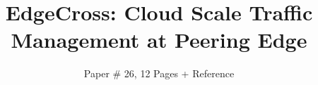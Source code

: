 \documentclass[letterpaper,twocolumn,10pt]{article}
\newcommand{\sys}{EdgeCross} %
\begin{document}


\date{}

\title{\Large \bf \sys: Cloud Scale Traffic Management at Peering Edge}

\author{\large 
Paper \# 26, 12 Pages + Reference
\\
}

\maketitle
\pagestyle{empty}










\newpage 



\end{document}
